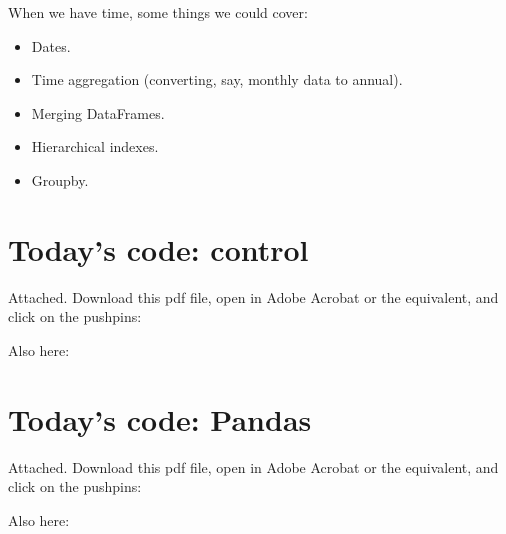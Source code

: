 \documentclass[11pt]{article}
\begin{document}
When we have time, some things we could cover:
\begin{itemize}
\item Dates.
\item Time aggregation (converting, say, monthly data to annual).

\item Merging DataFrames.

\item Hierarchical indexes.

\item Groupby.

\end{itemize}




\section*{Today's code:  control}

Attached.  Download this pdf file, open in Adobe Acrobat or the equivalent,
and click on the pushpins:

Also here:
{\small

}

\section*{Today's code:  Pandas}

Attached.  Download this pdf file, open in Adobe Acrobat or the equivalent,
and click on the pushpins:

Also here:
{\small

}
\end{document}
